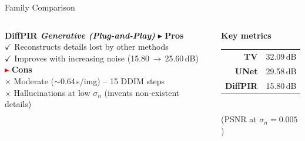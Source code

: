 \documentclass[english,10pt]{beamer}
\begin{document}
\begin{frame}{Family Comparison}
  \vspace{0.25cm}

  \begin{columns}[t]
      {%
      \begin{block}{\small\bfseries DiffPIR  \hfill \scriptsize\itshape Generative (Plug-and-Play)}
        \scriptsize
        \textcolor{green!50!black}{$\blacktriangleright$} \textbf{Pros}\\[0.05cm]
        \hspace{0.3cm}$\checkmark$ Reconstructs details lost by other methods\\
        \hspace{0.3cm}$\checkmark$ Improves with increasing noise (15.80\,$\to$\,25.60\,dB)\\[0.08cm]
        \textcolor{red}{$\blacktriangleright$} \textbf{Cons}\\[0.05cm]
        \hspace{0.3cm}$\times$  Moderate ($\sim$0.64\,s/img) -- 15 DDIM steps\\
        \hspace{0.3cm}$\times$  Hallucinations at low $\sigma_n$ (invents non-existent details)
      \end{block}}
      \begin{center}
        \textbf{Key metrics}\\[0.15cm]
        \begin{tabular}{rl}\small
          \textbf{TV} & 32.09\,dB\\
          \textbf{UNet} & 29.58\,dB\\
          \textbf{DiffPIR} & 15.80\,dB\\
        \end{tabular}\\[0.1cm]
        \scriptsize (PSNR at $\sigma_n=0.005$)
      \end{center}
  \end{columns}
\end{frame}
\end{document}
